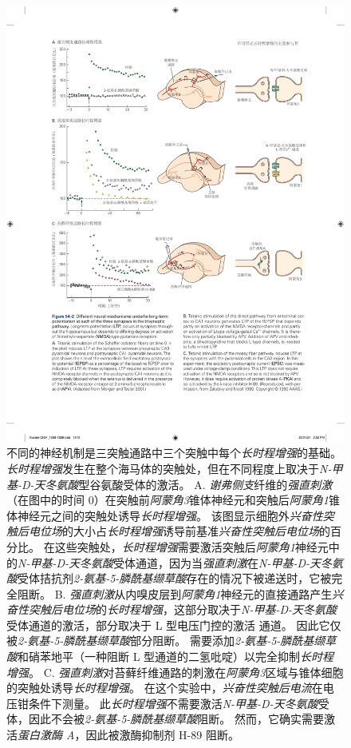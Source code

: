 \begin{figure}[htbp]
	\centering
	\includegraphics[width=1.0\linewidth]{chap54/fig_54_2}
	\caption{不同的神经机制是三突触通路中三个突触中每个\textit{长时程增强}的基础。
		\textit{长时程增强}发生在整个海马体的突触处，但在不同程度上取决于\textit{N-甲基-D-天冬氨酸}型谷氨酸受体的激活。
		A. \textit{谢弗侧支}纤维的\textit{强直刺激}（在图中的时间 0）在突触前\textit{阿蒙角3}锥体神经元和突触后\textit{阿蒙角1}锥体神经元之间的突触处诱导\textit{长时程增强}。
		该图显示细胞外\textit{兴奋性突触后电位场}的大小占\textit{长时程增强}诱导前基准\textit{兴奋性突触后电位场}的百分比。
		在这些突触处，\textit{长时程增强}需要激活突触后\textit{阿蒙角1}神经元中的\textit{N-甲基-D-天冬氨酸}受体通道，因为当\textit{强直刺激}在\textit{N-甲基-D-天冬氨酸}受体拮抗剂\textit{2-氨基-5-膦酰基缬草酸}存在的情况下被递送时，它被完全阻断\cite{morgan2001electrical}。
		B. \textit{强直刺激}从内嗅皮层到\textit{阿蒙角1}神经元的直接通路产生\textit{兴奋性突触后电位场}的\textit{长时程增强}，这部分取决于\textit{N-甲基-D-天冬氨酸}受体通道的激活，部分取决于 L 型电压门控的激活  通道。
		因此它仅被\textit{2-氨基-5-膦酰基缬草酸}部分阻断。
		需要添加\textit{2-氨基-5-膦酰基缬草酸}和硝苯地平（一种阻断 L 型通道的二氢吡啶）以完全抑制\textit{长时程增强}。
		C. \textit{强直刺激}对苔藓纤维通路的刺激在\textit{阿蒙角3}区域与锥体细胞的突触处诱导\textit{长时程增强}。
		在这个实验中，\textit{兴奋性突触后电流}在电压钳条件下测量。
		此\textit{长时程增强}不需要激活\textit{N-甲基-D-天冬氨酸}受体，因此不会被\textit{2-氨基-5-膦酰基缬草酸}阻断。
		然而，它确实需要激活\textit{蛋白激酶 A}，因此被激酶抑制剂 H-89 阻断\cite{zalutsky1990comparison}。}
	\label{fig:54_2}
\end{figure}


